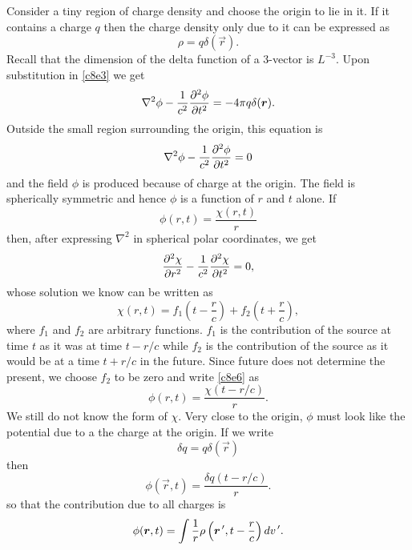 \begin{enumerate}
Consider a tiny region of charge density and choose the origin to lie in it. If
it contains a charge $q$ then the charge density only due to it can be expressed
as 
\begin{equation}\label{c8e5}
\rho = q\delta(\vec{r}).
\end{equation}
Recall that the dimension of the delta function of a 3-vector is $L^{-3}$. Upon
substitution in \eqref{c8e3} we get
\[
\nabla^2\phi - \frac{1}{c^2}\frac{\partial^2{\phi}}{\partial{t}^2} = -4\pi q\delta(\bm{r}).
\]
Outside the small region surrounding the origin, this equation is 
\[
\nabla^2\phi - \frac{1}{c^2}\frac{\partial^2{\phi}}{\partial{t}^2} = 0
\]
and the field $\phi$ is produced because of charge at the origin. The field is
spherically symmetric and hence $\phi$ is a function of $r$ and $t$ alone. If
\begin{equation}\label{c8e6}
\phi(r, t) = \frac{\chi(r, t)}{r}
\end{equation}
then, after expressing $\nabla^2$ in spherical polar coordinates, we get
\begin{equation}\label{c8e7}
\frac{\partial^2{\chi}}{\partial{r}^2} - \frac{1}{c^2}\frac{\partial^2{\chi}}{\partial{t}^2} = 0,
\end{equation}
whose solution we know can be written as
\begin{equation}\label{c8e8}
\chi(r, t) = f_1\left(t - \frac{r}{c}\right) + f_2\left(t + \frac{r}{c}\right),
\end{equation}
where $f_1$ and $f_2$ are arbitrary functions. $f_1$ is the contribution of the
source at time $t$ as it was at time $t - r/c$ while $f_2$ is the contribution
of the source as it would be at a time $t + r/c$ in the future. Since future 
does not determine the present, we choose $f_2$ to be zero and write 
\eqref{c8e6} as 
\begin{equation}\label{c8e9}
\phi(r, t) = \frac{\chi(t - r/c)}{r}.
\end{equation}
We still do not know the form of $\chi$. Very close to the origin, $\phi$ must
look like the potential due to a the charge at the origin. If we write 
\begin{equation}\label{c8e10}
\delta q = q\delta(\vec{r})
\end{equation}
then
\begin{equation}\label{c8e11}
\phi(\vec{r}, t) = \frac{\delta q (t - r/c)}{r}.
\end{equation}
so that the contribution due to all charges is
\begin{equation}\label{c8e12}
\phi(\vec{r}, t)=
\int \frac{1}{r}\rho\left(\vec{r}^\op, t - \frac{r}{c}\right)dv^\op.

\end{equation}
\end{enumerate}

